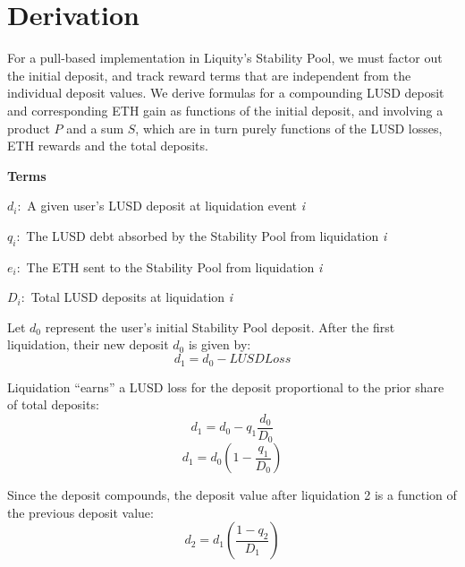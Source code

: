 \documentclass[reqno]{article}
\begin{document}
\section{Derivation}
For a pull-based implementation in Liquity’s Stability Pool, we must factor out the initial deposit, and track reward terms that are independent from the individual deposit values. We derive formulas for a compounding LUSD deposit and corresponding ETH gain as functions of the initial deposit, and involving a product $P$ and a sum $S$, which are in turn purely functions of the LUSD losses, ETH rewards and the total deposits.

\bigskip
\raggedright %

\textbf{Terms}
\begin{terms}
    \item $d_i:$ A given user’s LUSD deposit at liquidation event \textit{i}\\
    \item $q_i:$ The LUSD debt absorbed by the Stability Pool from liquidation \textit{i}\\
    \item $e_i:$ The ETH sent to the Stability Pool from liquidation \textit{i}\\
    \item $D_i:$ Total LUSD deposits at liquidation \textit{i}
\end{terms}

\bigskip
Let $d_0$ represent the user’s initial Stability Pool deposit. After the first liquidation, their new
deposit $d_0$ is given by:\\
\begin{equation} 
    d_1=d_0-LUSDLoss
\end{equation}

\bigskip
Liquidation “earns” a LUSD loss for the deposit proportional to the prior share of total deposits:
\begin{equation} 
    d_1=d_0-q_1\frac{d_0}{D_0}
\end{equation}
\begin{equation} 
    d_1=d_0\left(1-\frac{q_1}{D_0}\right)
\end{equation}

\bigskip
Since the deposit compounds, the deposit value after liquidation 2 is a function of the previous deposit value:
\begin{equation} 
    d_2=d_1\left(\frac{1-q_2}{D_1}\right)
\end{equation}
\end{document}
